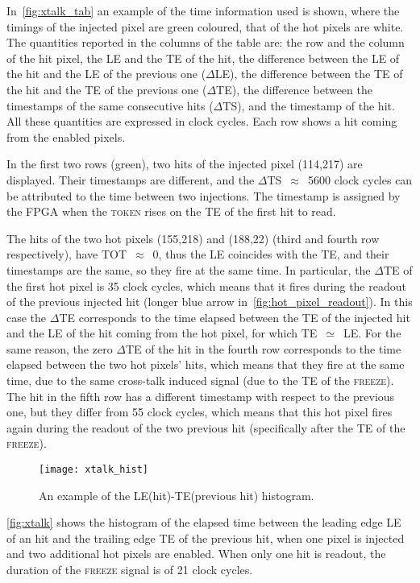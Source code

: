 In~\autoref{fig:xtalk_tab} an example of the time information used is shown, where the timings of the injected pixel are green coloured, that of the hot pixels are white. The quantities reported in the columns of the table are: the row and the column of the hit pixel, the LE and the TE of the hit, the difference between the LE of the hit and the LE of the previous one ($\Delta$LE), the difference between the TE of the hit and the TE of the previous one ($\Delta$TE), the difference between the timestamps of the same consecutive hits ($\Delta$TS), and the timestamp of the hit. All these quantities are expressed in clock cycles. Each row shows a hit coming from the enabled pixels.

In the first two rows (green), two hits of the injected pixel (114,217) are displayed. Their timestamps are different, and the $\Delta$TS~$\approx$~5600 clock cycles can be attributed to the time between two injections. The timestamp is assigned by the FPGA when the \textsc{token} rises on the TE of the first hit to read. 

The hits of the two hot pixels (155,218) and (188,22) (third and fourth row respectively), have TOT~$\approx$~0, thus the LE coincides with the TE, and their timestamps are the same, so they fire at the same time. In particular, the $\Delta$TE of the first hot pixel is 35 clock cycles, which means that it fires during the readout of the previous injected hit (longer blue arrow in~\autoref{fig:hot_pixel_readout}). In this case the $\Delta$TE corresponds to the time elapsed between the TE of the injected hit and the LE of the hit coming from the hot pixel, for which TE~$\simeq$~LE. For the same reason, the zero $\Delta$TE of the hit in the fourth row corresponds to the time elapsed between the two hot pixels' hits, which means that they fire at the same time, due to the same cross-talk induced signal (due to the TE of the \textsc{freeze}).
The hit in the fifth row has a different timestamp with respect to the previous one, but they differ from 55 clock cycles, which means that this hot pixel fires again during the readout of the two previous hit (specifically after the TE of the \textsc{freeze}). 

\begin{figure}[h!]
\centering
\texttt{[image: xtalk\_hist]}
\caption{An example of the LE(hit)-TE(previous hit) histogram.}
\label{fig:xtalk}
\end{figure}

\autoref{fig:xtalk} shows the histogram of the elapsed time between the leading edge LE of an hit and the trailing edge TE of the previous hit, when one pixel is injected and two additional hot pixels are enabled. When only one hit is readout, the duration of the \textsc{freeze} signal is of 21 clock cycles. 

